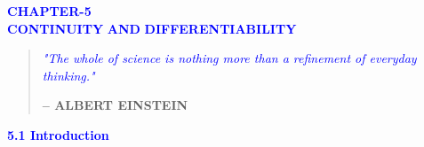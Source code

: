 \documentclass[a4paper, 12pt]{article}
\begin{document}
\begin{center}
    \textbf{\textcolor{blue}{\large CHAPTER-5}} \\
    \vspace{20pt}
    \textbf{\textcolor{blue}{\huge CONTINUITY}}
     \vspace{8pt}
    \textbf{\textcolor{blue}{\huge AND}}
    \vspace{8pt}
    \textbf{\textcolor{blue}{\huge DIFFERENTIABILITY}}
\end{center}

\begin{center}
    \begin{quote}
        \textit{\textcolor{blue}{\large "The whole of science is nothing more than a refinement of everyday thinking."}} \\
        \begin{flushright}
            \textbf{– ALBERT EINSTEIN}
        \end{flushright}
    \end{quote}
\end{center}

\pagestyle{fancy}
\fancyhf{} %
\fancyhead[C]{} %
\fancyhead[R]{\thepage} %
\renewcommand{\headrulewidth}{0pt} %
\renewcommand{\footrulewidth}{0pt} %

\vspace{10pt}
\textbf{\textcolor{blue}{\large 5.1 Introduction}}
\vspace{15pt}
\end{document}

